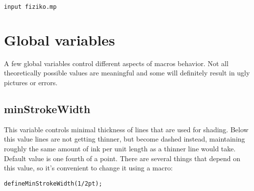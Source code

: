 \documentclass{article}
\begin{document}
\begin{lstlisting}
input fiziko.mp
\end{lstlisting}







\section{Global variables}
A few global variables control different aspects of macros behavior. Not all theoretically possible values are meaningful and some will definitely result in ugly pictures or errors.

\subsection{minStrokeWidth}
This variable controls minimal thickness of lines that are used for shading. Below this value lines are not getting thinner, but become dashed instead, maintaining roughly the same amount of ink per unit length as a thinner line would take. Default value is one fourth of a point. There are several things that depend on this value, so it's convenient to change it using a macro:

\begin{lstlisting}
defineMinStrokeWidth(1/2pt);
\end{lstlisting}
\end{document}
